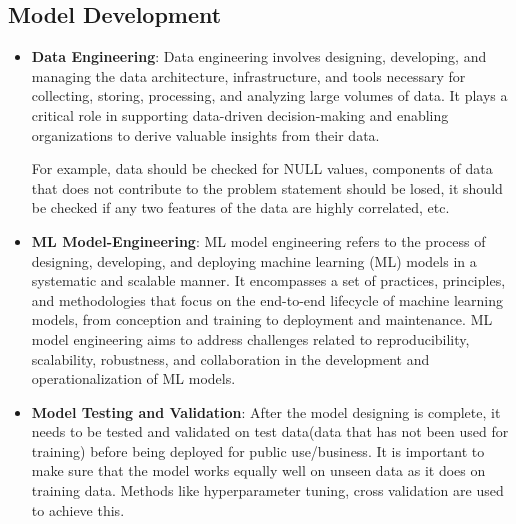 \documentclass[12pt]{article}
\begin{document}
\subsection{Model Development}
\begin{itemize}
    \item \textbf{Data Engineering}: Data engineering involves designing, developing, and managing the data architecture, infrastructure, and tools necessary for collecting, storing, processing, and analyzing large volumes of data. It plays a critical role in supporting data-driven decision-making and enabling organizations to derive valuable insights from their data. 

    For example, data should be checked for NULL values, components of data that does not contribute to the problem statement should be losed, it should be checked if any two features of the data are highly correlated, etc.

    \item \textbf{ML Model-Engineering}: ML model engineering refers to the process of designing, developing, and deploying machine learning (ML) models in a systematic and scalable manner. It encompasses a set of practices, principles, and methodologies that focus on the end-to-end lifecycle of machine learning models, from conception and training to deployment and maintenance. ML model engineering aims to address challenges related to reproducibility, scalability, robustness, and collaboration in the development and operationalization of ML models.

    \item \textbf{Model Testing and Validation}: After the model designing is complete, it needs to be tested and validated on test data(data that has not been used for training) before being deployed for public use/business. It is important to make sure that the model works equally well on unseen data as it does on training data. Methods like hyperparameter tuning, cross validation are used to achieve this.
\end{itemize}
\end{document}
